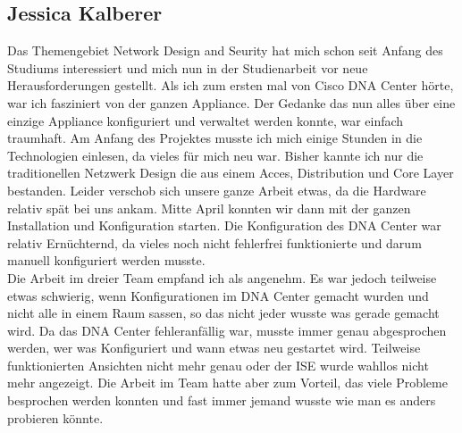 \subsection{Jessica Kalberer}
Das Themengebiet Network Design and Seurity hat mich schon seit Anfang des Studiums interessiert und mich nun in der Studienarbeit vor neue Herausforderungen gestellt. Als ich zum ersten mal von Cisco DNA Center hörte, war ich fasziniert von der ganzen Appliance. Der Gedanke das nun alles über eine einzige Appliance konfiguriert und verwaltet werden konnte, war einfach traumhaft. Am Anfang des Projektes musste ich mich einige Stunden in die  Technologien einlesen, da vieles für mich neu war. Bisher kannte ich nur die traditionellen Netzwerk Design die aus einem Acces, Distribution und Core Layer bestanden. Leider verschob sich unsere ganze Arbeit etwas, da die Hardware relativ spät bei uns ankam. Mitte April konnten wir dann mit der ganzen Installation und Konfiguration starten. Die  Konfiguration des DNA Center war relativ Ernüchternd, da vieles noch nicht fehlerfrei funktionierte und darum manuell konfiguriert werden musste. \\
Die Arbeit im dreier Team empfand ich als angenehm. Es war jedoch teilweise etwas schwierig, wenn Konfigurationen im DNA Center gemacht wurden und nicht alle in einem Raum sassen, so das nicht jeder wusste was gerade gemacht wird. Da das DNA Center fehleranfällig war, musste immer genau abgesprochen werden, wer was Konfiguriert und wann etwas neu gestartet wird. Teilweise funktionierten Ansichten nicht mehr genau oder der ISE wurde wahllos nicht mehr angezeigt. Die Arbeit im Team hatte aber zum Vorteil, das viele Probleme besprochen werden konnten und fast immer jemand wusste wie man es anders probieren könnte.